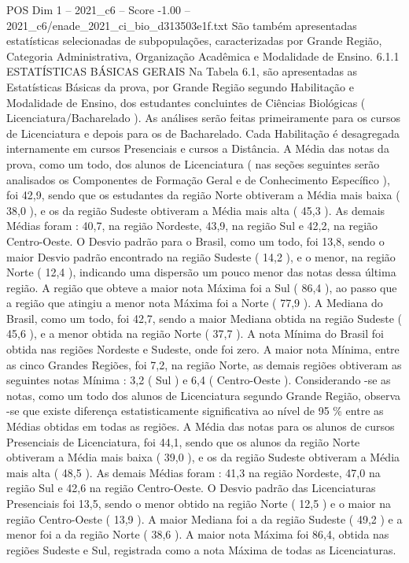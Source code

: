 \begin{textsample}{POS Dim 1 – 2021\_c6 – Score -1.00 – 2021\_c6/enade\_2021\_ci\_bio\_d313503e1f.txt}
São também apresentadas estatísticas selecionadas de subpopulações, caracterizadas por Grande Região, Categoria Administrativa, Organização Acadêmica e Modalidade de Ensino. 6.1.1 ESTATÍSTICAS BÁSICAS GERAIS Na Tabela 6.1, são apresentadas as Estatísticas Básicas da prova, por Grande Região segundo Habilitação e Modalidade de Ensino, dos estudantes concluintes de Ciências Biológicas ( Licenciatura/Bacharelado ).
As análises serão feitas primeiramente para os cursos de Licenciatura e depois para os de Bacharelado.
Cada Habilitação é desagregada internamente em cursos Presenciais e cursos a Distância.
A Média das notas da prova, como um todo, dos alunos de Licenciatura ( nas seções seguintes serão analisados os Componentes de Formação Geral e de Conhecimento Específico ), foi 42,9, sendo que os estudantes da região Norte obtiveram a Média mais baixa ( 38,0 ), e os da região Sudeste obtiveram a Média mais alta ( 45,3 ).
As demais Médias foram : 40,7, na região Nordeste, 43,9, na região Sul e 42,2, na região Centro-Oeste.
O Desvio padrão para o Brasil, como um todo, foi 13,8, sendo o maior Desvio padrão encontrado na região Sudeste ( 14,2 ), e o menor, na região Norte ( 12,4 ), indicando uma dispersão um pouco menor das notas dessa última região.
A região que obteve a maior nota Máxima foi a Sul ( 86,4 ), ao passo que a região que atingiu a menor nota Máxima foi a Norte ( 77,9 ).
A Mediana do Brasil, como um todo, foi 42,7, sendo a maior Mediana obtida na região Sudeste ( 45,6 ), e a menor obtida na região Norte ( 37,7 ).
A nota Mínima do Brasil foi obtida nas regiões Nordeste e Sudeste, onde foi zero.
A maior nota Mínima, entre as cinco Grandes Regiões, foi 7,2, na região Norte, as demais regiões obtiveram as seguintes notas Mínima : 3,2 ( Sul ) e 6,4 ( Centro-Oeste ).
Considerando -se as notas, como um todo dos alunos de Licenciatura segundo Grande Região, observa -se que existe diferença estatisticamente significativa ao nível de 95 \% entre as Médias obtidas em todas as regiões.
A Média das notas para os alunos de cursos Presenciais de Licenciatura, foi 44,1, sendo que os alunos da região Norte obtiveram a Média mais baixa ( 39,0 ), e os da região Sudeste obtiveram a Média mais alta ( 48,5 ).
As demais Médias foram : 41,3 na região Nordeste, 47,0 na região Sul e 42,6 na região Centro-Oeste.
O Desvio padrão das Licenciaturas Presenciais foi 13,5, sendo o menor obtido na região Norte ( 12,5 ) e o maior na região Centro-Oeste ( 13,9 ).
A maior Mediana foi a da região Sudeste ( 49,2 ) e a menor foi a da região Norte ( 38,6 ).
A maior nota Máxima foi 86,4, obtida nas regiões Sudeste e Sul, registrada como a nota Máxima de todas as Licenciaturas.

\end{textsample}
